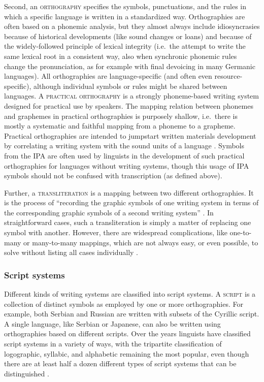 Second, an \textsc{orthography} specifies the symbols, punctuations, and the
rules in which a specific language is written in a standardized way.
Orthographies are often based on a phonemic analysis, but they almost always
include idiosyncrasies because of historical developments (like sound changes or
loans) and because of the widely-followed principle of lexical integrity
(i.e.~the attempt to write the same lexical root in a consistent way, also when
synchronic phonemic rules change the pronunciation, as for example with final
devoicing in many Germanic languages). All orthographies are language-specific
(and often even resource-specific), although individual symbols or rules might
be shared between languages. A \textsc{practical orthography} is a strongly
phoneme-based writing system designed for practical use by speakers. The mapping
relation between phonemes and graphemes in practical orthographies is purposely
shallow, i.e.~there is mostly a systematic and faithful mapping from a phoneme
to a grapheme. Practical orthographies are intended to jumpstart written
materials development by correlating a writing system with the sound units of a
language \citep[cf.~][]{MeinhofJones1928}. Symbols from the IPA are often used
by linguists in the development of such practical orthographies for languages
without writing systems, though this usage of IPA symbols should not be confused
with transcription (as defined above). 

Further, a \textsc{transliteration} is a mapping between two different
orthographies. It is the process of ``recording the graphic symbols of one
writing system in terms of the corresponding graphic symbols of a second writing
system'' \citep[396]{Kemp2006}. In straightforward cases, such a transliteration
is simply a matter of replacing one symbol with another. However, there are
widespread complications, like one-to-many or many-to-many mappings, which are
not always easy, or even possible, to solve without listing all cases
individually \citep[cf.~][Ch.~2]{Moran2012}.

\subsubsection*{Script systems}

Different kinds of writing systems are classified into script
systems. A \textsc{script} is a collection of distinct symbols as
employed by one or more orthographies. For example, both Serbian and Russian are
written with subsets of the Cyrillic script. A single language, like Serbian or
Japanese, can also be written using orthographies based on different scripts.
Over the years linguists have classified script systems in a variety of ways,
with the tripartite classification of logographic, syllabic, and alphabetic
remaining the most popular, even though there are at least half a dozen
different types of script systems that can be distinguished
\citep{Daniels1990,Daniels1996}.

